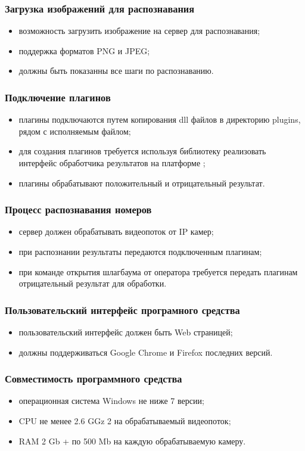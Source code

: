 \subsubsection{Загрузка изображений для распознавания}
\begin{itemize}
	\item возможность загрузить изображение на сервер для распознавания;
	\item поддержка форматов PNG и JPEG;
  \item должны быть показанны все шаги по распознаванию.
\end{itemize}

\subsubsection{Подключение плагинов}
\begin{itemize}
	\item плагины подключаются путем копирования dll файлов в директорию plugins, рядом с исполняемым файлом;
	\item для создания плагинов требуется используя библиотеку реализовать интерфейс обработчика результатов на платформе \dotnet{};
	\item плагины обрабатывают положительный и отрицательный результат.
\end{itemize}

\subsubsection{Процесс распознавания номеров}
\begin{itemize}
	\item сервер должен обрабатывать видеопоток от IP камер;
	\item при распознании результаты передаются подключенным плагинам;
	\item при команде открытия шлагбаума от оператора требуется передать плагинам отрицательный результат для обработки.
\end{itemize}

\subsubsection{Пользовательский интерфейс програмного средства}
\begin{itemize}
	\item пользовательский интерфейс должен быть Web страницей;
	\item должны поддерживаться Google Chrome и Firefox последних версий.
\end{itemize}

\subsubsection{Совместимость программного средства}
\begin{itemize}
  \item операционная система Windows не ниже 7 версии;
	\item CPU не менее 2.6 GGz 2 на обрабатываемый видеопоток;
  \item RAM 2 Gb + по 500 Mb на каждую обрабатываемую камеру.
\end{itemize}